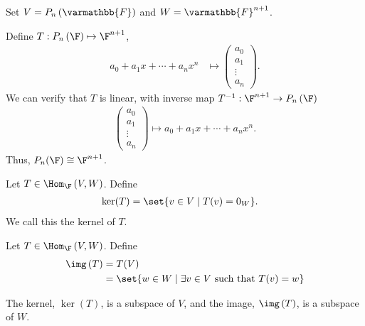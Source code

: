\documentclass[10pt]{mypackage}
\renewcommand*{\mathbb}[1]{\varmathbb{#1}}
\begin{document}
\begin{example}[$P_{n}\left(\mathbb{F}\right)$ and $\F^{n+1}$]
  Set $V = P_{n}\left(\mathbb{F}\right)$ and $W = \mathbb{F}^{n+1}$.\newline

  Define $T: P_{n}\left(\F\right) \mapsto \F^{n+1}$,
  \begin{align*}
    a_0 + a_1x + \cdots + a_nx^n &\mapsto \begin{pmatrix}a_0\\a_1\\\vdots\\a_n\end{pmatrix}.
  \end{align*}
  We can verify that $T$ is linear, with inverse map $T^{-1}: \F^{n+1}\rightarrow P_{n}\left(\F\right)$
  \begin{align*}
    \begin{pmatrix}a_0\\a_1\\\vdots\\a_n\end{pmatrix} \mapsto a_0 + a_1x + \cdots + a_nx^n.
  \end{align*}
  Thus, $P_n(\F) \cong \F^{n+1}$.
\end{example}
\begin{definition}[Kernel]
  Let $T\in \Hom_{\F}\left(V,W\right)$. Define
  \begin{align*}
    \ker (T) &= \set{v\in V\mid T(v) = 0_W}.
  \end{align*}
  We call this the kernel of $T$.
\end{definition}
\begin{definition}[Image]
  Let $T\in \Hom_{\F}\left(V,W\right)$. Define
  \begin{align*}
    \img\left(T\right) &= T(V)\\
                      &= \set{w\in W\mid \exists v\in V\text{ such that }T(v) = w}
  \end{align*}
\end{definition}
\begin{lemma}
  The kernel, $\ker(T)$, is a subspace of $V$, and the image, $\img\left(T\right)$, is a subspace of $W$.
\end{lemma}
\end{document}
